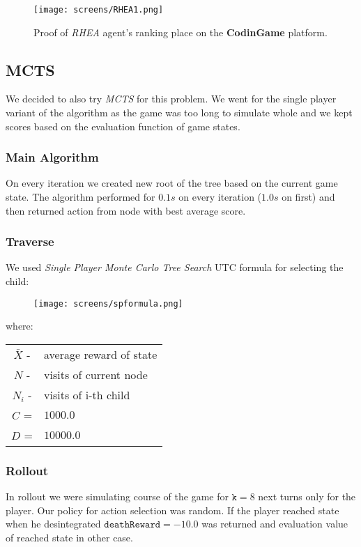 \documentclass[11pt]{article}
\begin{document}
	\begin{figure}[H]
 	    \centering
    	\texttt{[image: screens/RHEA1.png]} 	
	    \caption{Proof of \textit{RHEA} agent's ranking place on the \textbf{CodinGame} platform.}
 	\end{figure}
 	
 	
 	\subsection{MCTS}
    We decided to also try \textit{MCTS} for this problem. We went for the single player variant of the algorithm as the game was too long to simulate whole and we kept scores based on the evaluation function of game states.
    
    \subsubsection*{Main Algorithm}
    On every iteration we created new root of the tree based on the current game state. The algorithm performed for $0.1s$ on every iteration ($1.0s$ on first) and then returned action from node with best average score.
    
    \subsubsection*{Traverse}
    We used \textit{Single Player Monte Carlo Tree Search} UTC formula for selecting the child:
    \begin{figure}[H]
 	    \centering
    	\texttt{[image: screens/spformula.png]}
 	\end{figure}
 	\flushleft where:
    \begin{center}
		\begin{tabular}{ c  l }
			\texttt{$\bar{X}$} -& average reward of state \\
			\texttt{$N$} -& visits of current node \\
			\texttt{$N_i$} -& visits of i-th child \\
			\texttt{$C$} =& $1000.0$ \\
			\texttt{$D$} =& $10000.0$ \\
		\end{tabular}
	\end{center}
	
	\subsubsection*{Rollout}
	In rollout we were simulating course of the game for $\texttt{k} = 8$ next turns only for the player. Our policy for action selection was random. If the player reached state when he desintegrated $\texttt{deathReward} = -10.0$ was returned and evaluation value of reached state in other case.
\end{document}
